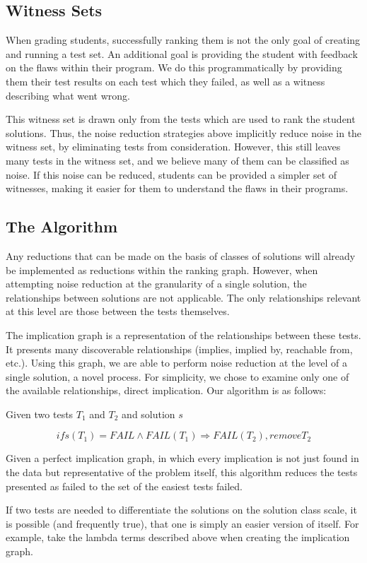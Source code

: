 \documentclass[11pt,twoside]{article}
\begin{document}
\subsection{Witness Sets}
When grading students, successfully ranking them is not the only goal of creating and running a test set. An additional goal is providing the student with feedback on the flaws within their program. We do this programmatically by providing them their test results on each test which they failed, as well as a witness describing what went wrong.

This witness set is drawn only from the tests which are used to rank the student solutions. Thus, the noise reduction strategies above implicitly reduce noise in the witness set, by eliminating tests from consideration. However, this still leaves many tests in the witness set, and we believe many of them can be classified as noise. If this noise can be reduced, students can be provided a simpler set of witnesses, making it easier for them to understand the flaws in their programs.

\subsection{The Algorithm}
Any reductions that can be made on the basis of classes of solutions will already be implemented as reductions within the ranking graph. However, when attempting noise reduction at the granularity of a single solution, the relationships between solutions are not applicable. The only relationships relevant at this level  are those between the tests themselves.

The implication graph is a representation of the relationships between these tests. It presents many discoverable relationships (implies, implied by, reachable from, etc.). Using this graph, we are able to perform noise reduction at the level of a single solution, a novel process. For simplicity, we chose to examine only one of the available relationships, direct implication. Our algorithm is as follows:

\centerline{Given two tests $T_1$ and $T_2$ and solution $s$}
$$if s(T_1) = FAIL \wedge FAIL(T_1) \Rightarrow FAIL(T_2), remove T_2$$

Given a perfect implication graph, in which every implication is not just found in the data but representative of the problem itself, this algorithm reduces the tests presented as  failed to the set of the easiest tests failed. 

If two tests are needed to differentiate the solutions on the solution class scale, it is possible (and frequently true), that one is simply an easier version of itself. For example, take the lambda terms described above when creating the implication graph. 
\end{document}
